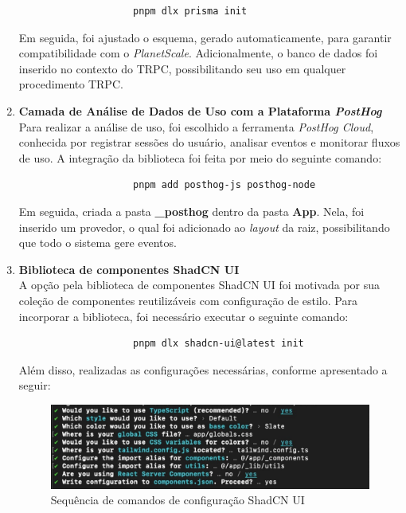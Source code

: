 \begin{enumerate}
    \begin{verbatim}
                    pnpm dlx prisma init
    \end{verbatim}
    
    Em seguida, foi ajustado o esquema, gerado automaticamente, para garantir compatibilidade com o \textit{PlanetScale}. Adicionalmente, o banco de dados foi inserido no contexto do TRPC, possibilitando seu uso em qualquer procedimento TRPC.

    \item\textbf{Camada de Análise de Dados de Uso com a Plataforma \textit{PostHog}}\\
    
    Para realizar a análise de uso, foi escolhido a ferramenta \textit{PostHog Cloud}, conhecida por registrar sessões do usuário, analisar eventos e monitorar fluxos de uso. A integração da biblioteca foi feita por meio do seguinte comando:
    
    \begin{verbatim}
                    pnpm add posthog-js posthog-node
    \end{verbatim}

    Em seguida, criada a pasta \textbf{\_posthog} dentro da pasta \textbf{App}. Nela, foi inserido um provedor, o qual foi adicionado ao \textit{layout} da raiz, possibilitando que todo o sistema gere eventos.
    
    \item\textbf{Biblioteca de componentes ShadCN UI}\\
    
    A opção pela biblioteca de componentes ShadCN UI foi motivada por sua coleção de componentes reutilizáveis com configuração de estilo. Para incorporar a biblioteca, foi necessário executar o seguinte comando:
    
    \begin{verbatim}
                    pnpm dlx shadcn-ui@latest init
    \end{verbatim}    
            
    Além disso, realizadas as configurações necessárias, conforme apresentado a seguir:
    
    \begin{figure}[!ht]
        \centering
        \includegraphics[scale=0.38]{latex/figuras/shadcnui.pdf}
        \caption[Ferramentas Principais do Projeto]{Sequência de comandos de configuração ShadCN UI}
        \label{fig:enter-label}
    \end{figure}


\end{enumerate}
